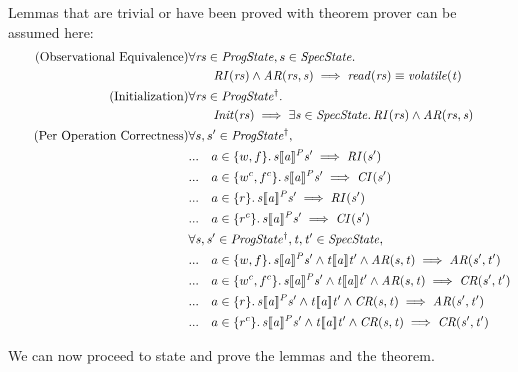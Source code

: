 \documentclass[letterpaper,twocolumn,10pt]{article}
\theoremstyle{definition}
\begin{document}
Lemmas that are trivial or have been proved with theorem prover can be assumed here:
\begin{align*}
	\tag{Observational Equivalence} & \forall \mathit{rs} \in \mathit{ProgState},s \in \mathit{SpecState} \ldotp \\
	& \qquad \mathit{RI(rs)} \land \mathit{AR(rs, s)} \implies \mathit{read(rs)} \equiv \mathit{volatile(t)} \\
	\tag{Initialization}\label{Initialization} &\forall \mathit{rs} \in \mathit{ProgState^\dagger} \ldotp\\
	&\qquad \mathit{Init(rs) \implies \exists s \in SpecState \ldotp RI(rs) \land AR(rs, s)}\\
	\tag{Per Operation Correctness} & \forall s, s' \in \mathit{ProgState^\dagger},\\
	&...	 \quad a \in \{w, f\} \ldotp \mathit{s \llbracket a \rrbracket^P s' \implies RI(s')}\\
	&...	 \quad a \in \{w^c, f^c\} \ldotp \mathit{s \llbracket a \rrbracket^P s' \implies CI(s')}\\
	&...	 \quad a \in \{r\} \ldotp \mathit{s \llbracket a \rrbracket^P s' \implies RI(s')}\\
	&...	 \quad a \in \{r^c\} \ldotp \mathit{s \llbracket a \rrbracket^P s' \implies CI(s')}\\
	&\mathit{\forall s, s' \in ProgState^\dagger, t, t' \in SpecState,}\\
	&...	 \quad a \in \{w, f\} \ldotp \mathit{s \llbracket a \rrbracket^P s' \land t \llbracket a \rrbracket t' \land AR(s, t) \implies AR(s', t')}\\
	&...	 \quad a \in \{w^c, f^c\} \ldotp \mathit{s \llbracket a \rrbracket^P s' \land t \llbracket a \rrbracket t' \land AR(s, t) \implies CR(s', t')}\\
	&...	 \quad a \in \{r\} \ldotp \mathit{s \llbracket a \rrbracket^P s' \land t \llbracket a \rrbracket t' \land CR(s, t) \implies AR(s', t')}\\
	&...	 \quad a \in \{r^c\} \ldotp \mathit{s \llbracket a \rrbracket^P s' \land t \llbracket a \rrbracket t' \land CR(s, t) \implies CR(s', t')}\\
\end{align*}

We can now proceed to state and prove the lemmas and the theorem.
\end{document}
